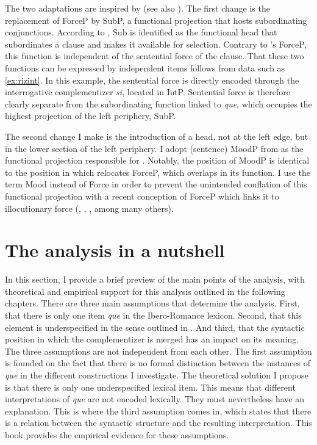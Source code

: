 The two adaptations  are inspired by \citet{Haegeman2006} (see also  \citealt{Roussou2010}). The first change is the replacement of ForceP by SubP, a functional projection that hosts subordinating conjunctions. According to \citet[1661]{Haegeman2006}, Sub is identified as the functional head that subordinates a clause and makes it available for selection. Contrary to \citeauthor{Rizzi1997}'s ForceP, this function is independent of the sentential force of the clause. That these two functions can be expressed by independent items follows  from data such as  \eqref{ex:rizint}. In this example, the sentential force is directly encoded through the interrogative complementizer \emph{si}, located in IntP. Sentential force is therefore clearly separate from the subordinating function linked to \emph{que}, which occupies the highest projection of the left periphery, SubP. 


The second change I make is the introduction of a  head, not  at the left edge, but in the lower section of the left periphery. 
I adopt  (sentence) MoodP from \citet{Lohnstein2015} as the functional projection responsible for .  Notably, the position of MoodP is identical to  the position in which \citet{Haegeman2006} relocates ForceP, which overlaps in its function. I use the term Mood instead of Force in order  to prevent the unintended conflation of this functional projection with a recent conception of ForceP which links it to illocutionary force (\citealt{SpeasTenny2003}, \citealt{Coniglio2010}, \citealt{Corr2016}, among many others). 


\section{The analysis in a nutshell}


In this section, I provide a brief preview of the main points of the analysis, with theoretical and empirical support for this analysis outlined in the following chapters. There are three main assumptions that determine the analysis. First, that there is only one item \emph{que} in the Ibero-Romance lexicon. Second, that this element is underspecified in the sense outlined in . And third, that the syntactic position in which the complementizer is merged  has an impact on its meaning. The three assumptions are not independent from each other. The first assumption is founded on the fact that there is no formal distinction between the instances of \emph{que} in the different constructions I investigate.  The theoretical solution I propose is that there is only one  underspecified lexical item. This means that different interpretations of \emph{que} are  not encoded lexically. They must nevertheless have an explanation. This is where  the third assumption comes in, which states that there is a relation between the syntactic structure and the resulting interpretation.  This book provides the  empirical evidence for these assumptions.  




